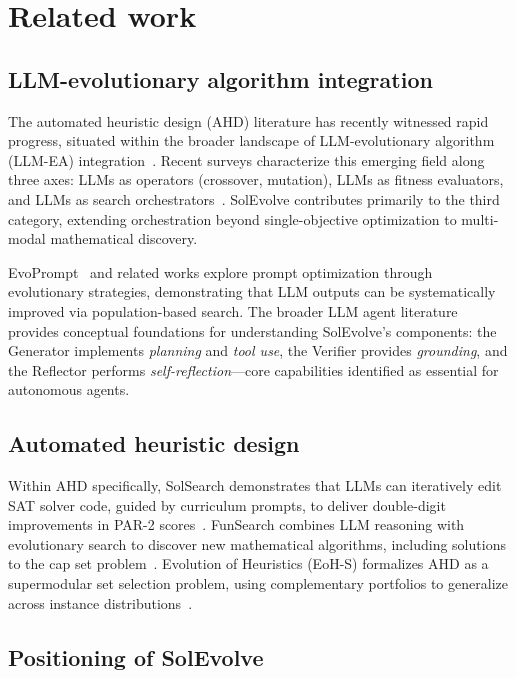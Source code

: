 \section{Related work}\label{sec:related}

\subsection{LLM-evolutionary algorithm integration}

The automated heuristic design (AHD) literature has recently witnessed rapid progress, situated within the broader landscape of LLM-evolutionary algorithm (LLM-EA) integration~\cite{Wu2024LLMEA_Survey,Huang2024LLMEA_Roadmap}. Recent surveys characterize this emerging field along three axes: LLMs as operators (crossover, mutation), LLMs as fitness evaluators, and LLMs as search orchestrators~\cite{Chao2024LLMEvolutionary}. SolEvolve contributes primarily to the third category, extending orchestration beyond single-objective optimization to multi-modal mathematical discovery.

EvoPrompt~\cite{Chen2024EvoPrompt} and related works explore prompt optimization through evolutionary strategies, demonstrating that LLM outputs can be systematically improved via population-based search. The broader LLM agent literature~\cite{Wang2024LLMAgentSurvey,Xi2023LLMAgentRise} provides conceptual foundations for understanding SolEvolve's components: the Generator implements \textit{planning} and \textit{tool use}, the Verifier provides \textit{grounding}, and the Reflector performs \textit{self-reflection}---core capabilities identified as essential for autonomous agents.

\subsection{Automated heuristic design}

Within AHD specifically, SolSearch demonstrates that LLMs can iteratively edit SAT solver code, guided by curriculum prompts, to deliver double-digit improvements in PAR-2 scores~\cite{Zhang2025SolSearch}. FunSearch combines LLM reasoning with evolutionary search to discover new mathematical algorithms, including solutions to the cap set problem~\cite{RomeraParedes2024FunSearch}. Evolution of Heuristics (EoH-S) formalizes AHD as a supermodular set selection problem, using complementary portfolios to generalize across instance distributions~\cite{Liu2024EoHS}.

\subsection{Positioning of SolEvolve}

